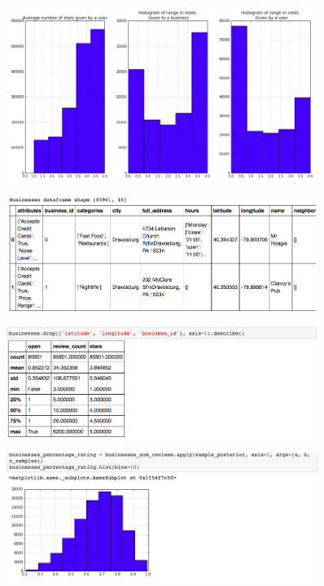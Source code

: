 \documentclass[11pt]{article}
\begin{document}
\begin{figure}[H]
\centering
\includegraphics[width=0.9\textwidth]{./ac209/avgstarsusersbusinesses-filter.png}
\end{figure}

\begin{figure}[H]
\centering
\includegraphics[width=0.9\textwidth]{./ac209/bizdataframe.png}
\end{figure}

\begin{figure}[H]
\centering
\includegraphics[width=0.9\textwidth]{./ac209/bizdescribe.png}
\end{figure}

\begin{figure}[H]
\centering
\includegraphics[width=0.9\textwidth]{./ac209/businessespctrating.png}
\end{figure}
\end{document}
